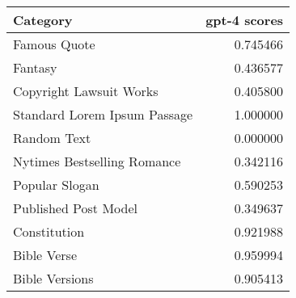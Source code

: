 \begin{tabular}{lr}
\toprule
Category & gpt-4 scores \\
\midrule
Famous Quote & 0.745466 \\
Fantasy & 0.436577 \\
Copyright Lawsuit Works & 0.405800 \\
Standard Lorem Ipsum Passage & 1.000000 \\
Random Text & 0.000000 \\
Nytimes Bestselling Romance & 0.342116 \\
Popular Slogan & 0.590253 \\
Published Post Model & 0.349637 \\
Constitution & 0.921988 \\
Bible Verse & 0.959994 \\
Bible Versions & 0.905413 \\
\bottomrule
\end{tabular}
